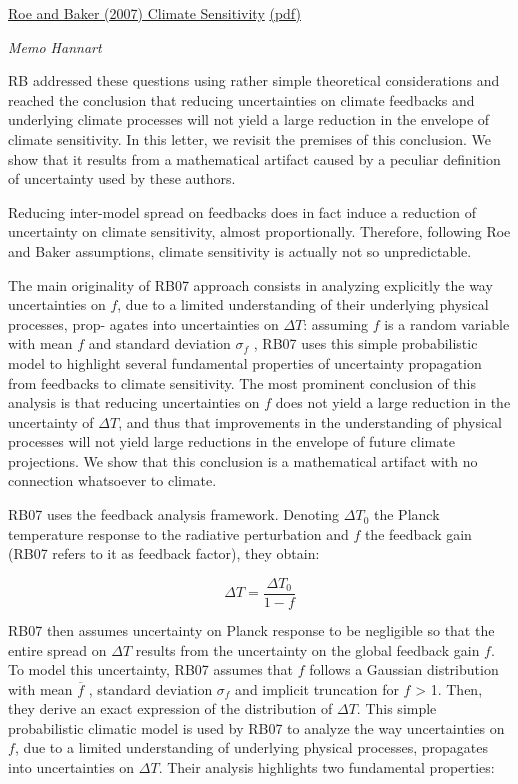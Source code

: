\documentclass[
]{book}
\begin{document}
\href{https://www.semanticscholar.org/paper/Why-Is-Climate-Sensitivity-So-Unpredictable-Roe-Baker/9a0c81f6887db897000dbce576b139a486f62c77}{Roe and Baker (2007) Climate Sensitivity}
\href{pdf/Roe_Baker_2007_Climate_Sensitivity.pdf}{(pdf)}

\emph{Memo Hannart}

RB addressed these questions using rather simple
theoretical considerations and reached the conclusion that
reducing uncertainties on climate feedbacks and underlying
climate processes will not yield a large reduction in the
envelope of climate sensitivity. In this letter, we revisit the
premises of this conclusion. We show that it results from a
mathematical artifact caused by a peculiar definition of
uncertainty used by these authors.

Reducing inter-model spread on
feedbacks does in fact induce a reduction of uncertainty on
climate sensitivity, almost proportionally.
Therefore, following Roe and Baker assumptions, climate sensitivity is actually
not so unpredictable.

The main originality of RB07 approach consists in analyzing
explicitly the way uncertainties on \(f\), due to a limited
understanding of their underlying physical processes, prop-
agates into uncertainties on \(\Delta T\): assuming \(f\) is a random
variable with mean \(f\) and standard deviation \(\sigma_f\) , RB07 uses
this simple probabilistic model to highlight several fundamental
properties of uncertainty propagation from feedbacks
to climate sensitivity. The most prominent conclusion of this
analysis is that reducing uncertainties on \(f\) does not yield a
large reduction in the uncertainty of \(\Delta T\), and thus that
improvements in the understanding of physical processes
will not yield large reductions in the envelope of future
climate projections.
We show that this conclusion is a mathematical artifact
with no connection whatsoever to climate.

RB07 uses the feedback analysis framework.
Denoting \(\Delta T_0\) the Planck temperature response to the radiative
perturbation and \(f\) the feedback gain (RB07 refers to it as
feedback factor), they obtain:

\[\Delta T = \frac{\Delta T_0}{1 - f}\]

RB07 then assumes uncertainty on Planck response to be
negligible so that the entire spread on \(\Delta T\) results from the
uncertainty on the global feedback gain \(f\). To model this
uncertainty, RB07 assumes that \(f\) follows a Gaussian
distribution with mean \(\overline{f}\) , standard deviation \(\sigma_f\) and implicit
truncation for \(f\) \textgreater{} 1.
Then, they derive an exact expression of the distribution of \(\Delta T\).
This simple probabilistic climatic model is used by RB07 to analyze the
way uncertainties on \(f\), due to a limited understanding of
underlying physical processes, propagates into uncertainties
on \(\Delta T\). Their analysis highlights two fundamental properties:
\end{document}
